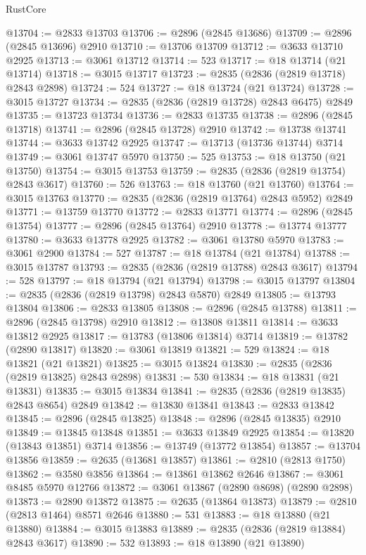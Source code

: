 \begin{lexlean}{RustCore}
\begin{coremodule}
@13704 := @2833 @13703
@13706 := @2896 (@2845 @13686)
@13709 := @2896 (@2845 @13696) @2910
@13710 := @13706 @13709
@13712 := @3633 @13710 @2925
@13713 := @3061 @13712
@13714 := 523
@13717 := @18 @13714 (@21 @13714)
@13718 := @3015 @13717
@13723 := @2835 (@2836 (@2819 @13718) @2843 @2898)
@13724 := 524
@13727 := @18 @13724 (@21 @13724)
@13728 := @3015 @13727
@13734 := @2835 (@2836 (@2819 @13728) @2843 @6475) @2849
@13735 := @13723 @13734
@13736 := @2833 @13735
@13738 := @2896 (@2845 @13718)
@13741 := @2896 (@2845 @13728) @2910
@13742 := @13738 @13741
@13744 := @3633 @13742 @2925
@13747 := @13713 (@13736 @13744) @3714
@13749 := @3061 @13747 @5970
@13750 := 525
@13753 := @18 @13750 (@21 @13750)
@13754 := @3015 @13753
@13759 := @2835 (@2836 (@2819 @13754) @2843 @3617)
@13760 := 526
@13763 := @18 @13760 (@21 @13760)
@13764 := @3015 @13763
@13770 := @2835 (@2836 (@2819 @13764) @2843 @5952) @2849
@13771 := @13759 @13770
@13772 := @2833 @13771
@13774 := @2896 (@2845 @13754)
@13777 := @2896 (@2845 @13764) @2910
@13778 := @13774 @13777
@13780 := @3633 @13778 @2925
@13782 := @3061 @13780 @5970
@13783 := @3061 @2900
@13784 := 527
@13787 := @18 @13784 (@21 @13784)
@13788 := @3015 @13787
@13793 := @2835 (@2836 (@2819 @13788) @2843 @3617)
@13794 := 528
@13797 := @18 @13794 (@21 @13794)
@13798 := @3015 @13797
@13804 := @2835 (@2836 (@2819 @13798) @2843 @5870) @2849
@13805 := @13793 @13804
@13806 := @2833 @13805
@13808 := @2896 (@2845 @13788)
@13811 := @2896 (@2845 @13798) @2910
@13812 := @13808 @13811
@13814 := @3633 @13812 @2925
@13817 := @13783 (@13806 @13814) @3714
@13819 := @13782 (@2890 @13817)
@13820 := @3061 @13819
@13821 := 529
@13824 := @18 @13821 (@21 @13821)
@13825 := @3015 @13824
@13830 := @2835 (@2836 (@2819 @13825) @2843 @2898)
@13831 := 530
@13834 := @18 @13831 (@21 @13831)
@13835 := @3015 @13834
@13841 := @2835 (@2836 (@2819 @13835) @2843 @8654) @2849
@13842 := @13830 @13841
@13843 := @2833 @13842
@13845 := @2896 (@2845 @13825)
@13848 := @2896 (@2845 @13835) @2910
@13849 := @13845 @13848
@13851 := @3633 @13849 @2925
@13854 := @13820 (@13843 @13851) @3714
@13856 := @13749 (@13772 @13854)
@13857 := @13704 @13856
@13859 := @2635 (@13681 @13857)
@13861 := @2810 (@2813 @1750)
@13862 := @3580 @3856
@13864 := @13861 @13862 @2646
@13867 := @3061 @8485 @5970 @12766
@13872 := @3061 @13867 (@2890 @8698) (@2890 @2898)
@13873 := @2890 @13872
@13875 := @2635 (@13864 @13873)
@13879 := @2810 (@2813 @1464) @8571 @2646
@13880 := 531
@13883 := @18 @13880 (@21 @13880)
@13884 := @3015 @13883
@13889 := @2835 (@2836 (@2819 @13884) @2843 @3617)
@13890 := 532
@13893 := @18 @13890 (@21 @13890)

\end{coremodule}
\end{lexlean}
